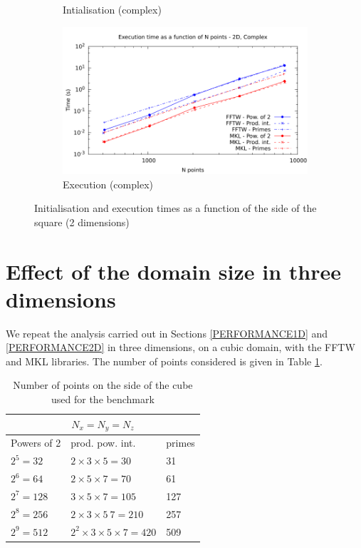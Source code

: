 \documentclass[12pt, a4paper]{article}
\begin{document}
\begin{figure}[H]
\begin{subfigure}{.5\textwidth}
\caption{Intialisation (complex)}
\label{2DCI}
\end{subfigure}%
\begin{subfigure}{.5\textwidth}
\centering
\includegraphics[width=.9\linewidth]{graphs/2d-exec-c.pdf}
\caption{Execution (complex)}
\label{2DC}
\end{subfigure}
\caption{Initialisation and execution times as a function of the side of the square (2 dimensions)}
\label{2D}
\end{figure}

\section{Effect of the domain size in three dimensions}\label{PERFORMANCE3D}

We repeat the analysis carried out in Sections \ref{PERFORMANCE1D} and \ref{PERFORMANCE2D} in three dimensions, on a cubic domain, with  the FFTW and MKL libraries. The number of points considered is given in Table \ref{SIZES3D}.

\begin{table}[H]
\captionsetup{width=0.85\linewidth}
\centering
\begin{tabular}{|l|l|l|}
  \hline
  \multicolumn{3}{|c|}{$N_x=N_y=N_z$}\\
  \hline
  \hline
  Powers of 2 & prod. pow. int. & primes\\ \hline
$2^5=32$ & $2\times 3\times 5=30$	& 31\\ \hline
$2^6=64$ & $2\times 5\times 7=70$	& 61\\ \hline
$2^7=128$ & $3\times 5\times 7=105$ & 127\\ \hline
$2^8=256$ & $2\times 3\times 5\ 7=210$ & 257\\ \hline
$2^9=512$ & $2^2\times 3\times 5\times 7=420$ & 509\\ \hline
\end{tabular}
\caption{Number of points on the side of the cube used for the benchmark}\label{SIZES3D}
\end{table}
\end{document}
